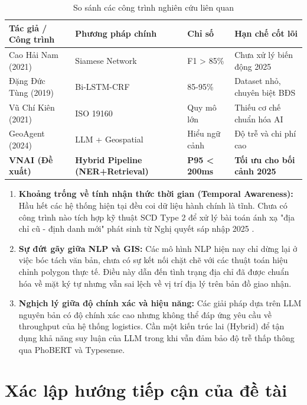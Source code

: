 \begin{table}[h]
\centering
\caption{So sánh các công trình nghiên cứu liên quan}
\label{tab:comparison}
\begin{tabular}{@{}llll@{}}
\toprule
\textbf{Tác giả / Công trình} & \textbf{Phương pháp chính} & \textbf{Chỉ số} & \textbf{Hạn chế cốt lõi} \\ \midrule
Cao Hải Nam (2021) & Siamese Network & F1 > 85\% & Chưa xử lý biến động 2025 \\
Đặng Đức Tùng (2019) & Bi-LSTM-CRF & 85-95\% & Dataset nhỏ, chuyên biệt BĐS \\
Vũ Chí Kiên (2021) & ISO 19160 & Quy mô lớn & Thiếu cơ chế chuẩn hóa AI \\
GeoAgent (2024) & LLM + Geospatial & Hiểu ngữ cảnh & Độ trễ và chi phí cao \\
\textbf{VNAI (Đề xuất)} & \textbf{Hybrid Pipeline (NER+Retrieval)} & \textbf{P95 < 200ms} & \textbf{Tối ưu cho bối cảnh 2025} \\ \bottomrule
\end{tabular}
\end{table}

\begin{enumerate}
\item \textbf{Khoảng trống về tính nhận thức thời gian (Temporal Awareness):} Hầu hết các hệ thống hiện tại đều coi dữ liệu hành chính là tĩnh. Chưa có công trình nào tích hợp kỹ thuật SCD Type 2 để xử lý bài toán ánh xạ "địa chỉ cũ - định danh mới" phát sinh từ Nghị quyết sáp nhập 2025 \cite{qh2025}.
\item \textbf{Sự đứt gãy giữa NLP và GIS:} Các mô hình NLP hiện nay chỉ dừng lại ở việc bóc tách văn bản, chưa có sự kết nối chặt chẽ với các thuật toán hiệu chỉnh polygon thực tế. Điều này dẫn đến tình trạng địa chỉ đã được chuẩn hóa về mặt ký tự nhưng vẫn sai lệch về vị trí địa lý trên bản đồ giao nhận.
\item \textbf{Nghịch lý giữa độ chính xác và hiệu năng:} Các giải pháp dựa trên LLM nguyên bản có độ chính xác cao nhưng không thể đáp ứng yêu cầu về throughput của hệ thống logistics. Cần một kiến trúc lai (Hybrid) để tận dụng khả năng suy luận của LLM trong khi vẫn đảm bảo độ trễ thấp thông qua PhoBERT và Typesense.
\end{enumerate}

\section{Xác lập hướng tiếp cận của đề tài}

